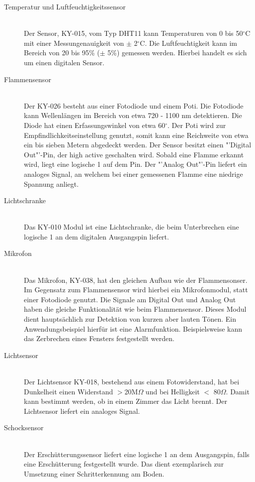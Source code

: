 \begin{description}
\item[Temperatur und Luftfeuchtigkeitssensor] \hfill \\
	Der Sensor, KY-015, vom Typ DHT11 kann Temperaturen von 0 bis 50$^\circ$C mit einer Messungenauigkeit von $\pm$ 2$^\circ$C. Die Luftfeuchtigkeit kann im Bereich von 20 bis 95\% ($\pm$ 5\%) gemessen werden. Hierbei handelt es sich um einen digitalen Sensor.  
\item[Flammensensor]\hfill \\
	Der KY-026 besteht aus einer Fotodiode und einem \ac{Poti}. Die Fotodiode kann Wellenlängen im Bereich von etwa 720 - 1100 nm detektieren. Die Diode hat einen Erfassungswinkel von etwa 60$^\circ$. Der \ac{Poti} wird zur Empfindlichkeitseinstellung genutzt, somit kann eine Reichweite von etwa  ein bis sieben Metern abgedeckt werden. Der Sensor besitzt einen "'Digital Out"'-Pin, der high active geschalten wird. Sobald eine Flamme erkannt wird, liegt eine logische 1 auf dem Pin. Der "'Analog Out"'-Pin liefert ein analoges Signal, an welchem bei einer gemessenen Flamme eine niedrige Spannung anliegt.
\item[Lichtschranke]\hfill \\
	Das KY-010 Modul ist eine Lichtschranke, die beim Unterbrechen eine logische 1 an dem digitalen Ausgangspin liefert.
\item[Mikrofon]\hfill \\
	Das Mikrofon, KY-038, hat den gleichen Aufbau wie der Flammensonser. Im Gegensatz zum Flammensensor wird hierbei ein Mikrofonmodul, statt einer Fotodiode genutzt. Die Signale am Digital Out und Analog Out haben die gleiche Funktionalität wie beim Flammensensor. Dieses Modul dient hauptsächlich zur Detektion von kurzen aber lauten Tönen. Ein Anwendungsbeispiel hierfür ist eine Alarmfunktion. Beispielsweise kann das Zerbrechen eines Fensters festgestellt werden.
\item[Lichtsensor]\hfill \\
	Der Lichtsensor KY-018, bestehend aus einem Fotowiderstand, hat bei Dunkelheit einen Widerstand $>$20M$\Omega$ und bei Helligkeit $<$ 80$\Omega$. Damit kann bestimmt werden, ob in einem Zimmer das Licht brennt. Der Lichtsensor liefert ein analoges Signal.
\item[Schocksensor]\hfill \\
	Der Erschütterungssensor liefert eine logische 1 an dem Ausgangspin, falls eine Erschütterung festgestellt wurde. Das dient exemplarisch zur Umsetzung einer Schritterkennung am Boden.
\end{description}

